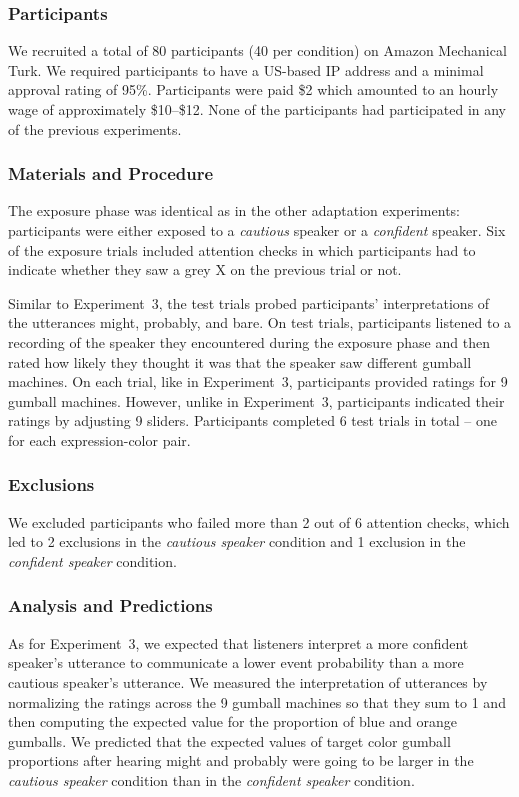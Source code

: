 \documentclass[man, floatsintext]{apa6}
\begin{document}
\subsubsection*{Participants}

We recruited a total of 80 participants (40 per condition) on Amazon Mechanical Turk. We required participants to have a US-based IP address and a minimal approval rating of 95\%. Participants were paid \$2 which amounted to an hourly wage of approximately \$10--\$12. None of the participants had participated in any of the previous experiments. 

\subsubsection*{Materials and Procedure}

The exposure phase was identical as in the other adaptation experiments: participants were either exposed to a 
\textit{cautious} speaker or a \textit{confident} speaker. Six of the exposure trials included attention checks in which
participants had to indicate whether they saw a grey X on the previous trial or not.

Similar to Experiment~3, the test trials probed participants'
interpretations of the utterances {\sc might}, {\sc probably}, and {\sc bare}. On test trials, participants listened
to a recording of the speaker they encountered during the exposure phase and then rated how likely they
thought it was that the speaker saw different gumball machines. On each trial, like in Experiment~3, participants
provided ratings for 9 gumball machines. However, unlike in Experiment~3, participants indicated their ratings
by adjusting 9 sliders. Participants completed 6 test trials in total -- one for each expression-color pair.

\subsubsection*{Exclusions}

We excluded participants who failed more than 2 out of 6 attention checks, which led to 2 exclusions in the \emph{cautious speaker} condition and 1 exclusion in the \emph{confident speaker} condition.


\subsubsection*{Analysis and Predictions}

As for Experiment~3, we expected that listeners interpret a more confident speaker's utterance 
to communicate a lower event probability than a more cautious speaker's utterance. We measured
the interpretation of utterances by normalizing the ratings across the 9 gumball machines so that they sum to
1 and then computing the expected value for the proportion of blue and orange gumballs. 
We predicted that the expected values of target color gumball proportions after hearing {\sc might} and {\sc probably} 
were going to be larger in the \emph{cautious speaker} condition than in the \emph{confident speaker} condition.
\end{document}
